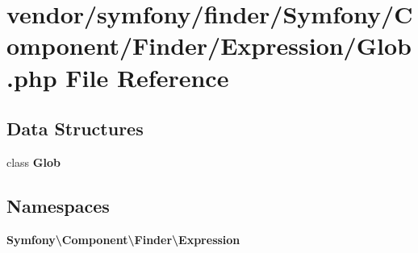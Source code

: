 \section{vendor/symfony/finder/\+Symfony/\+Component/\+Finder/\+Expression/\+Glob.php File Reference}
\label{_expression_2_glob_8php}
\subsection*{Data Structures}
\begin{DoxyCompactItemize}
\item 
class {\bf Glob}
\end{DoxyCompactItemize}
\subsection*{Namespaces}
\begin{DoxyCompactItemize}
\item 
 {\bf Symfony\textbackslash{}\+Component\textbackslash{}\+Finder\textbackslash{}\+Expression}
\end{DoxyCompactItemize}
